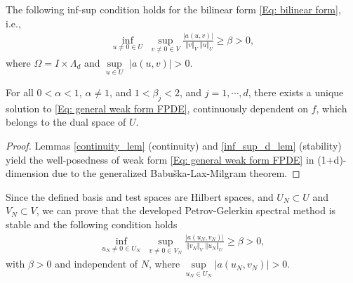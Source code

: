 \begin{thm}[Stability]
	\label{inf_sup_d_lem}
	The following inf-sup condition holds for the bilinear form \eqref{Eq: bilinear form}, i.e.,
	\begin{align}
	\label{Eq: inf sup-time_d_well}
	\underset{ u \neq 0  \in U}{\inf} \,\, \underset{ v \neq 0 \in V}{\sup}
	\frac{\vert a(u , v)\vert}{ \,\, \Vert v\Vert_{V} \,\, \Vert u \Vert_{U} } \geq \beta > 0,
	\end{align}
	where $\Omega = I \times \Lambda_d$ and $\underset{u \in U}{\sup} \,\, \vert a(u , v)\vert>0$.
\end{thm}



\begin{thm}
	\label{Thm: well-posedness_1D}
	For all $0<\alpha<1$, $\alpha \neq 1$, and  $1<\beta_j<2$, and $j=1,\cdots,d$, there exists a unique solution to \eqref{Eq: general weak form FPDE}, continuously dependent on  $f$, which belongs to the dual space of $U$.
\end{thm}
%
\begin{proof}
	Lemmas \ref{continuity_lem} (continuity) and \ref{inf_sup_d_lem} (stability) yield the well-posedness of weak form \eqref{Eq: general weak form FPDE} in (1+d)-dimension due to the generalized Babu\v{s}ka-Lax-Milgram theorem.
\end{proof}

Since the defined basis and test spaces are Hilbert spaces, and $U_N \subset U$ and $V_N \subset V$, we can prove that the developed Petrov-Gelerkin spectral method is stable and the following condition holds
%
\begin{align}
\label{Eq: inf sup-time}
%
\underset{u_N \neq 0 \in U_N}{\inf}\, \, \underset{v \neq 0 \in V_N}{\sup}
\frac{\vert a(u_N , v_N)\vert}{\Vert v_N\Vert_{V} \,\, \Vert u_N\Vert_{U}} \geq \beta > 0, 
%
\end{align}
%
with $\beta > 0$ and independent of $N$, where $\underset{u_N \in U_N}{\sup} \vert a(u_N , v_N)\vert>0$.
